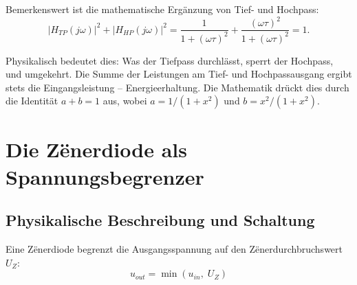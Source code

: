 ﻿\documentclass[12pt, a4paper]{article}
\begin{document}
	Bemerkenswert ist die mathematische Ergänzung von Tief- und Hochpass:
	\begin{equation}
		|H_{TP}(j\omega)|^2 + |H_{HP}(j\omega)|^2 = \frac{1}{1+(\omega\tau)^2} + \frac{(\omega\tau)^2}{1+(\omega\tau)^2} = 1.
	\end{equation}
	
	Physikalisch bedeutet dies: Was der Tiefpass durchlässt, sperrt der Hochpass, und umgekehrt. Die Summe der Leistungen am Tief- und Hochpassausgang ergibt stets die Eingangsleistung -- Energieerhaltung. Die Mathematik drückt dies durch die Identität $a + b = 1$ aus, wobei $a = 1/(1+x^2)$ und $b = x^2/(1+x^2)$.
	
	\section{Die Z\"{e}nerdiode als Spannungsbegrenzer}
	
	\subsection{Physikalische Beschreibung und Schaltung}
	
	Eine Z\"{e}nerdiode begrenzt die Ausgangsspannung auf den Z\"{e}nerdurchbruchswert $U_Z$:
	\begin{equation}
		u_{out} = \min(u_{in},\; U_Z)
	\end{equation}
	
\end{document}
